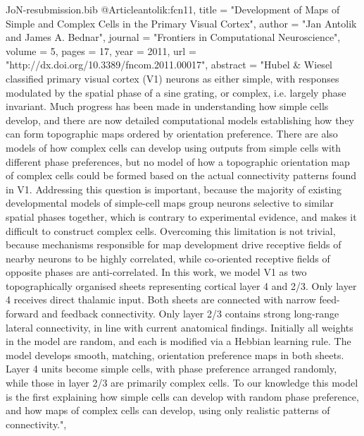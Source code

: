 \documentclass{article}
\begin{document}
\begin{filecontents}{JoN-resubmission.bib}
@Article{antolik:fcn11,
  title	       = "Development of Maps of Simple and Complex Cells in
                  the Primary Visual Cortex",
  author       = "Jan Antolik and James A. Bednar",
  journal      = "Frontiers in Computational Neuroscience",
  volume       = 5,
  pages        = 17,
  year	       = 2011,
  url	       = "http://dx.doi.org/10.3389/fncom.2011.00017",
  abstract     = "Hubel & Wiesel classified primary visual cortex (V1)
                  neurons as either simple, with responses modulated
                  by the spatial phase of a sine grating, or complex,
                  i.e. largely phase invariant. Much progress has been
                  made in understanding how simple cells develop, and
                  there are now detailed computational models
                  establishing how they can form topographic maps
                  ordered by orientation preference. There are also
                  models of how complex cells can develop using
                  outputs from simple cells with different phase
                  preferences, but no model of how a topographic
                  orientation map of complex cells could be formed
                  based on the actual connectivity patterns found in
                  V1. Addressing this question is important, because
                  the majority of existing developmental models of
                  simple-cell maps group neurons selective to similar
                  spatial phases together, which is contrary to
                  experimental evidence, and makes it difficult to
                  construct complex cells. Overcoming this limitation
                  is not trivial, because mechanisms responsible for
                  map development drive receptive fields of nearby
                  neurons to be highly correlated, while co-oriented
                  receptive fields of opposite phases are
                  anti-correlated. In this work, we model V1 as two
                  topographically organised sheets representing
                  cortical layer 4 and 2/3. Only layer 4 receives
                  direct thalamic input. Both sheets are connected
                  with narrow feed-forward and feedback
                  connectivity. Only layer 2/3 contains strong
                  long-range lateral connectivity, in line with
                  current anatomical findings. Initially all weights
                  in the model are random, and each is modified via a
                  Hebbian learning rule. The model develops smooth,
                  matching, orientation preference maps in both
                  sheets. Layer 4 units become simple cells, with
                  phase preference arranged randomly, while those in
                  layer 2/3 are primarily complex cells. To our
                  knowledge this model is the first explaining how
                  simple cells can develop with random phase
                  preference, and how maps of complex cells can
                  develop, using only realistic patterns of
                  connectivity.",
}


\end{filecontents}
\end{document}
